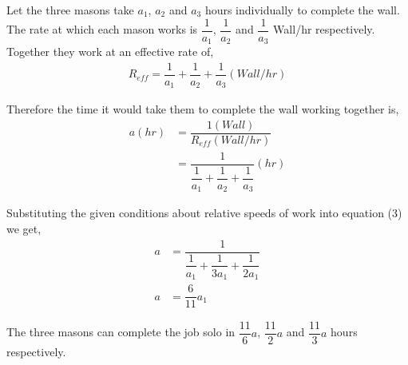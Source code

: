 \begin{solution}
  Let the three masons take $a_1$, $a_2$ and $a_3$ hours individually to complete the wall. The rate at which each mason works is $\dfrac{1}{a_1}$, $\dfrac{1}{a_2}$ and $\dfrac{1}{a_3}$ Wall/hr respectively. Together they work at an effective rate of,
  \begin{align}
	R_{eff} = \dfrac{1}{a_1} + \dfrac{1}{a_2} + \dfrac{1}{a_3} (Wall/hr)
  \end{align}
  
  Therefore the time it would take them to complete the wall working together is,
  \begin{align}
    a(hr) &= \dfrac{1(Wall)}{R_{eff}(Wall/hr)} \\
          &= \dfrac{1}{\dfrac{1}{a_1} + \dfrac{1}{a_2} + \dfrac{1}{a_3}}(hr)
  \end{align}  
  
  Substituting the given conditions about relative speeds of work into equation (3) we get,
  \begin{align}
    a &= \dfrac{1}{\dfrac{1}{a_1} + \dfrac{1}{3a_1} + \dfrac{1}{2a_1}} \\
    a &= \dfrac{6}{11}a_1
  \end{align}
  
  The three masons can complete the job solo in $\dfrac{11}{6}a$, $\dfrac{11}{2}a$ and $\dfrac{11}{3}a$ hours respectively.
  
\end{solution}

